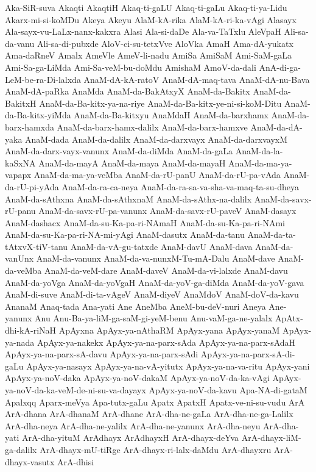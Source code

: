 {Aka-SiR-suva
Akaqti
AkaqtiH
Akaq-ti-gaLU
Akaq-ti-gaLu
Akaq-ti-ya-Lidu
Akarx-mi-si-koMDu
Akeya
Akeyu
AlaM-kA-rika
AlaM-kA-ri-ka-vAgi
Alasayx
Ala-sayx-vu-LaLx-nanx-kakxra
Alasi
Ala-si-daDe
Ala-va-TaTxlu
AleVpaH
Ali-sa-da-vanu
Ali-sa-di-pubxde
AloV-ci-su-tetxVve
AloVka
AmaH
Ama-dA-yukatx
Ama-daRneV
Amalx
AmeVle
AmeV-li-nadu
AmiSa
AmiSaM
Ami-SaM-gaLa
Ami-Sa-ga-LiMda
Ami-Sa-veM-bu-doMdu
AmishaM
AmoV-da-dali
AnA-di-ga-LeM-be-ra-Di-lalxda
AnaM-dA-kA-ratoV
AnaM-dA-maq-tava
AnaM-dA-nu-Bava
AnaM-dA-paRka
AnaMda
AnaM-da-BakAtxyX
AnaM-da-Bakitx
AnaM-da-BakitxH
AnaM-da-Ba-kitx-ya-na-riye
AnaM-da-Ba-kitx-ye-ni-si-koM-Ditu
AnaM-da-Ba-kitx-yiMda
AnaM-da-Ba-kitxyu
AnaMdaH
AnaM-da-barxhamx
AnaM-da-barx-hamxda
AnaM-da-barx-hamx-dalilx
AnaM-da-barx-hamxve
AnaM-da-dA-yaka
AnaM-dada
AnaM-da-dalilx
AnaM-da-darxvayx
AnaM-da-darxvayxM
AnaM-da-darx-vayx-vanunx
AnaM-da-diMda
AnaM-da-gaLa
AnaM-da-la-kaSxNA
AnaM-da-mayA
AnaM-da-maya
AnaM-da-mayaH
AnaM-da-ma-ya-vapapx
AnaM-da-ma-ya-veMba
AnaM-da-rU-panU
AnaM-da-rU-pa-vAda
AnaM-da-rU-pi-yAda
AnaM-da-ra-ca-neya
AnaM-da-ra-sa-va-sha-va-maq-ta-su-dheya
AnaM-da-sAthxna
AnaM-da-sAthxnaM
AnaM-da-sAthx-na-dalilx
AnaM-da-savx-rU-panu
AnaM-da-savx-rU-pa-vanunx
AnaM-da-savx-rU-paveV
AnaM-dasayx
AnaM-dashacx
AnaM-da-su-Ka-pa-ri-NAmaH
AnaM-da-su-Ka-pa-ri-NAmi
AnaM-da-su-Ka-pa-ri-NA-mi-yAgi
AnaM-dasutx
AnaM-da-tanu
AnaM-da-ta-tAtxvX-tiV-tanu
AnaM-da-vA-gu-tatxde
AnaM-davU
AnaM-dava
AnaM-da-vanUnx
AnaM-da-vanunx
AnaM-da-va-nunxM-Tu-mA-Dalu
AnaM-dave
AnaM-da-veMba
AnaM-da-veM-dare
AnaM-daveV
AnaM-da-vi-lalxde
AnaM-davu
AnaM-da-yoVga
AnaM-da-yoVgaH
AnaM-da-yoV-ga-diMda
AnaM-da-yoV-gava
AnaM-di-suve
AnaM-di-ta-vAgeV
AnaM-diyeV
AnaMdoV
AnaM-doV-da-kavu
AnanaM
Anaq-tada
Ana-yati
Ane
AneMba
AneM-bu-deV-nuri
Aneya
Ane-yanunx
Anu
Anu-Ba-ya-liM-ga-saM-gi-yeM-benu
Anu-vaM-ga-ne-yalalx
ApAtx-dhi-kA-riNaH
ApAyxna
ApAyx-ya-nAthaRM
ApAyx-yana
ApAyx-yanaM
ApAyx-ya-nada
ApAyx-ya-nakekx
ApAyx-ya-na-parx-sAda
ApAyx-ya-na-parx-sAdaH
ApAyx-ya-na-parx-sA-davu
ApAyx-ya-na-parx-sAdi
ApAyx-ya-na-parx-sA-di-gaLu
ApAyx-ya-nasayx
ApAyx-ya-na-vA-yitutx
ApAyx-ya-na-va-ritu
ApAyx-yani
ApAyx-ya-noV-daka
ApAyx-ya-noV-dakaM
ApAyx-ya-noV-da-ka-vAgi
ApAyx-ya-noV-da-ka-veM-de-ni-su-va-dayayx
ApAyx-ya-noV-da-kavu
Apa-NA-di-gataM
Apalxqq
Aparx-meVya
Apa-tutx-gaLu
Apatx
ApatxH
Apatx-ve-ni-su-vudu
ArA
ArA-dhana
ArA-dhanaM
ArA-dhane
ArA-dha-ne-gaLa
ArA-dha-ne-ga-Lalilx
ArA-dha-neya
ArA-dha-ne-yalilx
ArA-dha-ne-yanunx
ArA-dha-neyu
ArA-dha-yati
ArA-dha-yituM
ArAdhayx
ArAdhayxH
ArA-dhayx-deYva
ArA-dhayx-liM-ga-dalilx
ArA-dhayx-mU-tiRge
ArA-dhayx-ri-lalx-daMdu
ArA-dhayxru
ArA-dhayx-vasutx
ArA-dhisi
}
